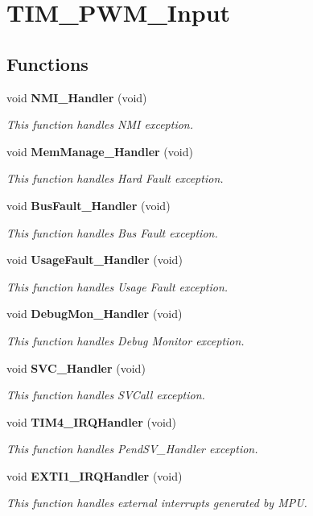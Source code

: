 \section{T\+I\+M\+\_\+\+P\+W\+M\+\_\+\+Input}
\label{group__TIM__PWM__Input}
\subsection*{Functions}
\begin{DoxyCompactItemize}
\item 
void \textbf{ N\+M\+I\+\_\+\+Handler} (void)
\begin{DoxyCompactList}\small\item\em This function handles N\+MI exception. \end{DoxyCompactList}\item 
void \textbf{ Mem\+Manage\+\_\+\+Handler} (void)
\begin{DoxyCompactList}\small\item\em This function handles Hard Fault exception. \end{DoxyCompactList}\item 
void \textbf{ Bus\+Fault\+\_\+\+Handler} (void)
\begin{DoxyCompactList}\small\item\em This function handles Bus Fault exception. \end{DoxyCompactList}\item 
void \textbf{ Usage\+Fault\+\_\+\+Handler} (void)
\begin{DoxyCompactList}\small\item\em This function handles Usage Fault exception. \end{DoxyCompactList}\item 
void \textbf{ Debug\+Mon\+\_\+\+Handler} (void)
\begin{DoxyCompactList}\small\item\em This function handles Debug Monitor exception. \end{DoxyCompactList}\item 
void \textbf{ S\+V\+C\+\_\+\+Handler} (void)
\begin{DoxyCompactList}\small\item\em This function handles S\+V\+Call exception. \end{DoxyCompactList}\item 
void \textbf{ T\+I\+M4\+\_\+\+I\+R\+Q\+Handler} (void)
\begin{DoxyCompactList}\small\item\em This function handles Pend\+S\+V\+\_\+\+Handler exception. \end{DoxyCompactList}\item 
void \textbf{ E\+X\+T\+I1\+\_\+\+I\+R\+Q\+Handler} (void)
\begin{DoxyCompactList}\small\item\em This function handles external interrupts generated by M\+PU. \end{DoxyCompactList}\end{DoxyCompactItemize}
